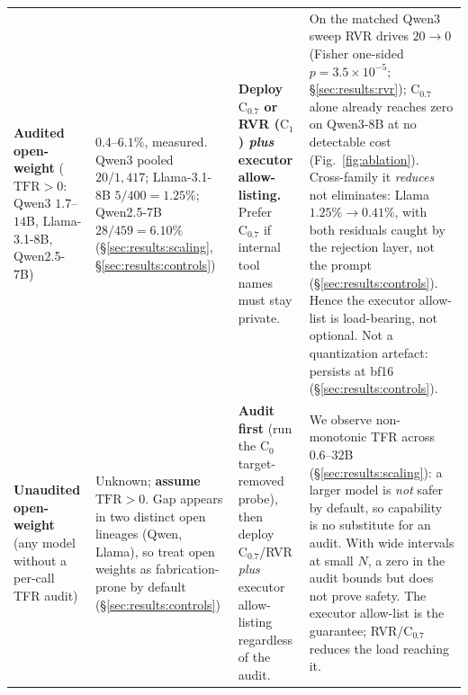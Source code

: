 \begin{table}[tb]
\begin{tabular}{p{2.5cm}p{3.0cm}p{4.3cm}p{4.3cm}}
\textbf{Audited open-weight} \newline ($\mathrm{TFR}\!>\!0$: Qwen3 $1.7$--$14$B,
Llama-3.1-8B, Qwen2.5-7B) &
$0.4$--$6.1\%$, measured. \newline Qwen3 pooled $20/1{,}417$; Llama-3.1-8B
$5/400\!=\!1.25\%$; Qwen2.5-7B $28/459\!=\!6.10\%$ \newline
(\S\ref{sec:results:scaling}, \S\ref{sec:results:controls}) &
\textbf{Deploy $\mathrm{C}_{0.7}$ or RVR ($\mathrm{C}_1$) \emph{plus} executor
allow-listing.} Prefer $\mathrm{C}_{0.7}$ if internal tool names must stay
private. &
On the matched Qwen3 sweep RVR drives $20\!\to\!0$ (Fisher one-sided
$p\!=\!3.5\!\times\!10^{-5}$; \S\ref{sec:results:rvr}); $\mathrm{C}_{0.7}$ alone
already reaches zero on Qwen3-8B at no detectable cost
(Fig.~\ref{fig:ablation}). Cross-family it \emph{reduces} not eliminates: Llama
$1.25\%\!\to\!0.41\%$, with both residuals caught by the rejection layer, not
the prompt (\S\ref{sec:results:controls}). Hence the executor allow-list is
load-bearing, not optional. Not a quantization artefact: persists at bf16
(\S\ref{sec:results:controls}). \\

\textbf{Unaudited open-weight} \newline (any model without a per-call TFR audit) &
Unknown; \textbf{assume $\mathrm{TFR}\!>\!0$}. \newline Gap appears in two
distinct open lineages (Qwen, Llama), so treat open weights as fabrication-prone
by default (\S\ref{sec:results:controls}) &
\textbf{Audit first} (run the $\mathrm{C}_0$ target-removed probe), then deploy
$\mathrm{C}_{0.7}$/RVR \emph{plus} executor allow-listing regardless of the
audit. &
We observe non-monotonic TFR across $0.6$--$32$B (\S\ref{sec:results:scaling}):
a larger model is \emph{not} safer by default, so capability is no substitute
for an audit. With wide intervals at small $N$, a zero in the audit bounds but
does not prove safety. The executor allow-list is the guarantee; RVR/$\mathrm{C}_{0.7}$
reduces the load reaching it. \\

\bottomrule
\end{tabular}
\end{table}
